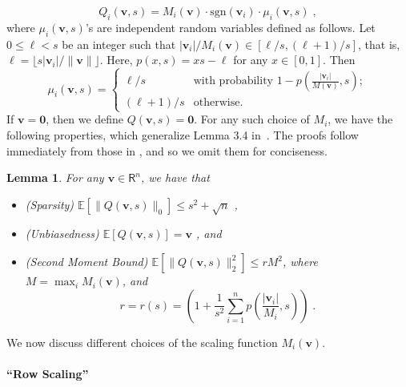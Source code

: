 \documentclass{article}
\newcommand{\R}{\mathsf{R}}
\newcommand{\sgn}[1]{\mbox{sgn}(#1)}
\renewcommand{\vec}[1]{\mathbf{#1}}
\def\E{\mathbb{E}}
\newtheorem{lemma}{Lemma}
\begin{document}
\begin{equation}
Q_i(\vec{v},s) = M_i(\vec{v}) \cdot \sgn{\vec{v}_i} \cdot \mu_i(\vec{v},s) \; , \label{equ:quant2}
\end{equation}
where $\mu_i(\vec{v},s)$'s are independent random variables defined as follows. 
Let $0 \leq \ell < s$ be an integer such that $|\vec{v}_i|/M_i(\vec{v}) \in [ \ell / s, (\ell + 1) / s ]$, that is, $\ell = \lfloor s |\vec{v}_i|/\| \vec{v} \| \rfloor$. 
Here, $p(x,s) = x s - \ell$ for any $x \in [0,1]$.
Then 
\[
\mu_i(\vec{v},s) = \left\{ \begin{array}{ll}
         \ell / s & \mbox{with probability $1 - p\left(\frac{|\vec{v}_i|}{M(\vec{v})},s\right)$};\\
         (\ell + 1) / s & \mbox{otherwise}. \end{array} \right.
\]
If $\vec{v} = \vec{0}$, then we define $Q(\vec{v},s) = \vec{0}$.
For any such choice of $M_i$, we have the following properties, which generalize Lemma 3.4 in~\cite{QSGD}.
The proofs follow immediately from those in \cite{QSGD}, and so we omit them for conciseness.
\begin{lemma}
\label{lem:quant-facts}
 For any $\vec{v} \in \R^n$, we have that 
 \begin{itemize} 
 \item (Sparsity) $\E[ \|Q(\vec{v}, s)\|_0]\leq
 s^2 +\sqrt{n}$ , 
 \item (Unbiasedness) $\E [Q (\vec{v},s)] = \vec{v}$ , and
 \item (Second Moment Bound) 
$\E [\| Q (\vec{v},s) \|_2^2] \leq r M^2$, where $M = \max_i M_i (\vec{v})$, and 
\[
r = r(s) = \left( 1 + \frac{1}{s^2} \sum_{i = 1}^n p\left( \frac{|\vec{v}_i|}{M_i },s \right) \right) \; .
\]
 \end{itemize}
\end{lemma}


We now discuss different choices of the scaling function $M_i(\vec{v})$.

\paragraph*{``Row Scaling''}
\end{document}
